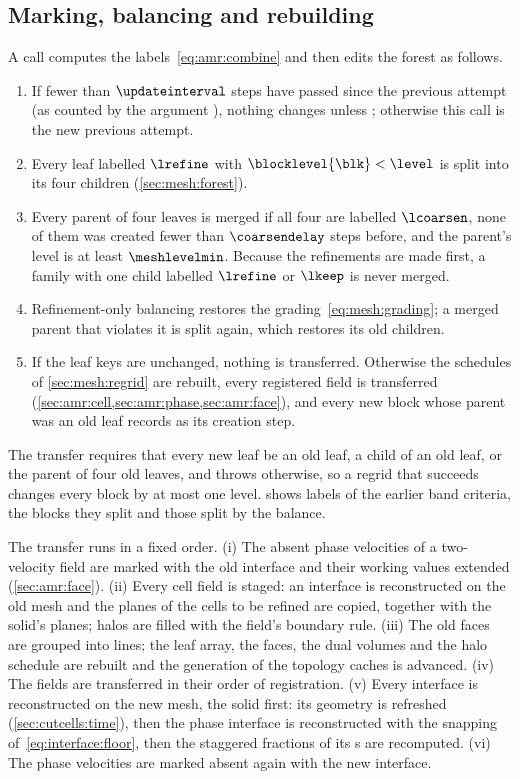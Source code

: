 \subsection{Marking, balancing and rebuilding}\label{sec:amr:marking}
A call  computes the
labels~\cref{eq:amr:combine} and then edits the forest as follows.
\begin{enumerate}
\item If fewer than $\updateinterval$ steps have passed since the previous
  attempt (as counted by the argument ), nothing changes unless
  ; otherwise this call is the new previous attempt.
\item Every leaf labelled $\lrefine$ with $\blocklevel{\blk}<\level$ is split
  into its four children (\cref{sec:mesh:forest}).
\item Every parent of four leaves is merged if all four are labelled
  $\lcoarsen$, none of them was created fewer than $\coarsendelay$ steps
  before, and the parent's level is at least $\meshlevelmin$. Because the
  refinements are made first, a family with one child labelled $\lrefine$ or
  $\lkeep$ is never merged.
\item Refinement-only balancing restores the grading~\cref{eq:mesh:grading};
  a merged parent that violates it is split again, which restores its old
  children.
\item If the leaf keys are unchanged, nothing is transferred. Otherwise the
  schedules of \cref{sec:mesh:regrid} are rebuilt, every registered field is
  transferred (\cref{sec:amr:cell,sec:amr:phase,sec:amr:face}), and every new
  block whose parent was an old leaf records  as its creation step.
\end{enumerate}
The transfer requires that every new leaf be an old leaf, a child of an old
leaf, or the parent of four old leaves, and throws otherwise, so a regrid
that succeeds changes every block by at most one level.
 shows labels of the earlier band criteria, the blocks
they split and those split by the balance.

The transfer runs in a fixed order. (i) The absent phase velocities of a
two-velocity field are marked with the old interface and their working values
extended (\cref{sec:amr:face}). (ii) Every cell field is staged: an interface
is reconstructed on the old mesh and the planes of the cells to be refined are
copied, together with the solid's planes; halos are filled with the field's
boundary rule. (iii) The old faces are grouped into lines; the leaf array, the
faces, the dual volumes and the halo schedule are rebuilt and the generation
of the topology caches is advanced. (iv) The fields are transferred in their
order of registration. (v) Every interface is reconstructed on the new mesh,
the solid first: its geometry is refreshed (\cref{sec:cutcells:time}), then
the phase interface is reconstructed with the snapping
of~\cref{eq:interface:floor}, then the staggered fractions of its
s are recomputed. (vi) The phase velocities are
marked absent again with the new interface.

